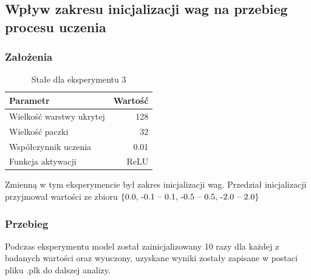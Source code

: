 \documentclass{article}
\begin{document}
\newpage
\subsection{Wpływ zakresu inicjalizacji wag na przebieg procesu uczenia}
\subsubsection*{Założenia}
\begin{table}[H]
	\caption{Stałe dla eksperymentu 3}
	\label{tabela-const-3}
	\centering
	\begin{tabular}{lr}
		\toprule
		Parametr                   & Wartość \\
		\midrule
		Wielkość warstwy ukrytej & 128       \\
		Wielkość paczki          & 32        \\
		Współczynnik uczenia     & 0.01      \\
		Funkcja aktywacji          & ReLU      \\
		\bottomrule
	\end{tabular}
\end{table}

Zmienną w tym eksperymencie był zakres inicjalizacji wag. Przedział inicjalizacji przyjmował wartości ze zbioru \(\{$0.0, -0.1 -- 0.1, -0.5 -- 0.5, -2.0 -- 2.0$\}\)
\subsubsection*{Przebieg}

Podczas eksperymentu model został zainicjalizowany 10 razy dla każdej z badanych wartości oraz wyuczony, uzyskane wyniki zostały zapisane w postaci pliku .plk do dalszej analizy.
\end{document}
